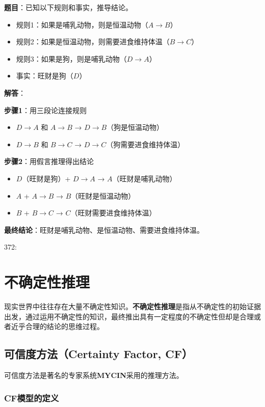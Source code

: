 \begin{examplebox}[例题3.6 综合推理练习]
\textbf{题目}：已知以下规则和事实，推导结论。
\begin{itemize}[itemsep=0pt]
    \item 规则1：如果是哺乳动物，则是恒温动物（$A \to B$）
    \item 规则2：如果是恒温动物，则需要进食维持体温（$B \to C$）
    \item 规则3：如果是狗，则是哺乳动物（$D \to A$）
    \item 事实：旺财是狗（$D$）
\end{itemize}
\tcblower
\textbf{解答}：

\textbf{步骤1}：用三段论连接规则
\begin{itemize}[itemsep=0pt]
    \item $D \to A$ 和 $A \to B$ → $D \to B$（狗是恒温动物）
    \item $D \to B$ 和 $B \to C$ → $D \to C$（狗需要进食维持体温）
\end{itemize}

\textbf{步骤2}：用假言推理得出结论
\begin{itemize}[itemsep=0pt]
    \item $D$（旺财是狗）+ $D \to A$ → $A$（旺财是哺乳动物）
    \item $A$ + $A \to B$ → $B$（旺财是恒温动物）
    \item $B$ + $B \to C$ → $C$（旺财需要进食维持体温）
\end{itemize}

\textbf{最终结论}：旺财是哺乳动物、是恒温动物、需要进食维持体温。
\end{examplebox}


372: \section{不确定性推理}

现实世界中往往存在大量不确定性知识。\textbf{不确定性推理}是指从不确定性的初始证据出发，通过运用不确定性的知识，最终推出具有一定程度的不确定性但却是合理或者近乎合理的结论的思维过程。

\subsection{可信度方法（Certainty Factor, CF）}

可信度方法是著名的专家系统\textbf{MYCIN}采用的推理方法。

\subsubsection{CF模型的定义}

